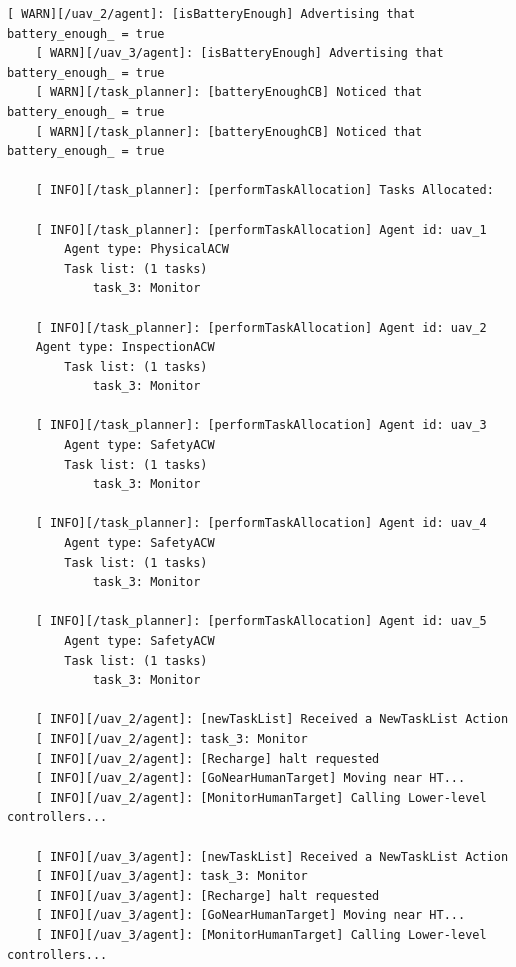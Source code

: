 \begin{lstlisting}[caption={Feedback messages printed after the battery of two UAVs is fully charged}, breaklines=true, label=exit:BatOk]
    [ WARN][/uav_2/agent]: [isBatteryEnough] Advertising that battery_enough_ = true
    [ WARN][/uav_3/agent]: [isBatteryEnough] Advertising that battery_enough_ = true
    [ WARN][/task_planner]: [batteryEnoughCB] Noticed that battery_enough_ = true
    [ WARN][/task_planner]: [batteryEnoughCB] Noticed that battery_enough_ = true
    
    [ INFO][/task_planner]: [performTaskAllocation] Tasks Allocated:
    
    [ INFO][/task_planner]: [performTaskAllocation] Agent id: uav_1
        Agent type: PhysicalACW
        Task list: (1 tasks)
            task_3: Monitor
    
    [ INFO][/task_planner]: [performTaskAllocation] Agent id: uav_2
    Agent type: InspectionACW
        Task list: (1 tasks)
            task_3: Monitor
    
    [ INFO][/task_planner]: [performTaskAllocation] Agent id: uav_3
        Agent type: SafetyACW
        Task list: (1 tasks)
            task_3: Monitor
    
    [ INFO][/task_planner]: [performTaskAllocation] Agent id: uav_4
        Agent type: SafetyACW
        Task list: (1 tasks)
            task_3: Monitor
    
    [ INFO][/task_planner]: [performTaskAllocation] Agent id: uav_5
        Agent type: SafetyACW
        Task list: (1 tasks)
            task_3: Monitor
    
    [ INFO][/uav_2/agent]: [newTaskList] Received a NewTaskList Action
    [ INFO][/uav_2/agent]: task_3: Monitor
    [ INFO][/uav_2/agent]: [Recharge] halt requested
    [ INFO][/uav_2/agent]: [GoNearHumanTarget] Moving near HT...
    [ INFO][/uav_2/agent]: [MonitorHumanTarget] Calling Lower-level controllers...
    
    [ INFO][/uav_3/agent]: [newTaskList] Received a NewTaskList Action
    [ INFO][/uav_3/agent]: task_3: Monitor
    [ INFO][/uav_3/agent]: [Recharge] halt requested
    [ INFO][/uav_3/agent]: [GoNearHumanTarget] Moving near HT...
    [ INFO][/uav_3/agent]: [MonitorHumanTarget] Calling Lower-level controllers...
\end{lstlisting}

